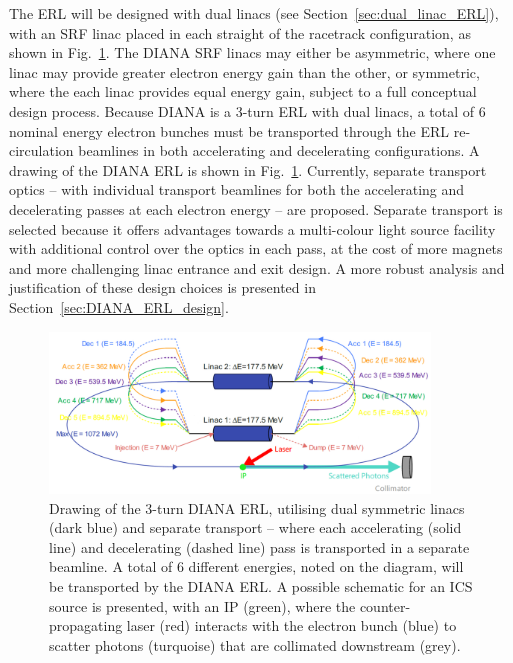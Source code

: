 \documentclass[../main.tex]{subfiles}
\begin{document}
The ERL will be designed with dual linacs (see Section~\ref{sec:dual_linac_ERL}), with an SRF linac placed in each straight of the racetrack configuration, as shown in Fig.~\ref{fig:DIANA_ERL_diagram}. The DIANA SRF linacs may either be asymmetric, where one linac may provide greater electron energy gain than the other, or symmetric, where the each linac provides equal energy gain, subject to a full conceptual design process. Because DIANA is a 3-turn ERL with dual linacs, a total of 6 nominal energy electron bunches must be transported through the ERL re-circulation beamlines in both accelerating and decelerating configurations. A drawing of the DIANA ERL is shown in Fig.~\ref{fig:DIANA_ERL_diagram}. Currently, separate transport optics -- with individual transport beamlines for both the accelerating and decelerating passes at each electron energy -- are proposed. Separate transport is selected because it offers advantages towards a multi-colour light source facility with additional control over the optics in each pass, at the cost of more magnets and more challenging linac entrance and exit design. A more robust analysis and justification of these design choices is presented in Section~\ref{sec:DIANA_ERL_design}. 
\begin{figure}[!h]
\centering
\includegraphics[width=0.9\textwidth]{Figures/DIANA_Inverse_Compton_Source_Design/DIANA_diagram_fixed.pdf}
\caption{Drawing of the 3-turn DIANA ERL, utilising dual symmetric linacs (dark blue) and separate transport -- where each accelerating (solid line) and decelerating (dashed line) pass is transported in a separate beamline. A total of 6 different energies, noted on the diagram, will be transported by the DIANA ERL. A possible schematic for an ICS source is presented, with an IP (green), where the counter-propagating laser (red) interacts with the electron bunch (blue) to scatter photons (turquoise) that are collimated downstream (grey).}
\label{fig:DIANA_ERL_diagram}
\end{figure}
\end{document}
